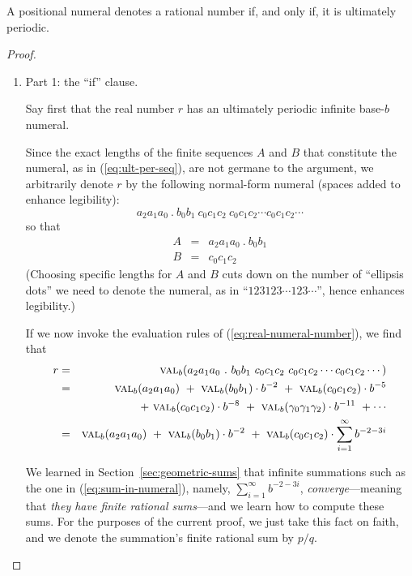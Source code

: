 \begin{prop}
\label{thm:rational-real}
A positional numeral denotes a rational number if, and only if, it is
ultimately periodic.
\end{prop}

\begin{proof}

\begin{enumerate}
\item 
{\small\sf Part 1: the ``if'' clause.}

Say first that the real number $r$ has an ultimately periodic infinite
base-$b$ numeral.

Since the exact lengths of the finite sequences $A$ and $B$ that
constitute the numeral, as in (\ref{eq:ult-per-seq}), are not germane
to the argument, we arbitrarily denote $r$ by the following
normal-form numeral (spaces added to enhance legibility):
\[  a_2 a_1 a_0 \ . \ b_0 b_1 \
c_0 c_1 c_2 \
c_0 c_1 c_2
\cdots
c_0 c_1 c_2
\cdots
\]
so that
\begin{eqnarray*}
A & = & a_2 a_1 a_0 \ . \ b_0 b_1 \\
B & = & c_0 c_1 c_2
\end{eqnarray*}
(Choosing specific lengths for $A$ and $B$ cuts down on the number of
``ellipsis dots'' we need to denote the numeral, as in ``$123 123
\cdots 123 \cdots$'', hence enhances legibility.)

If we now invoke the evaluation rules of (\ref{eq:real-numeral-number}),
we find that
\begin{eqnarray}
\nonumber
r & = &
\mbox{\sc val}_b(a_2 a_1 a_0 \ . \ b_0 b_1 \
c_0 c_1 c_2 \
c_0 c_1 c_2
\cdots
c_0 c_1 c_2
\cdots) \\
\nonumber
  & = &
\mbox{\sc val}_b(a_2 a_1 a_0)
 \ + \ \mbox{\sc val}_b(b_0 b_1) \cdot b^{-2}
 \ + \
\mbox{\sc val}_b(c_0 c_1 c_2) \cdot b^{-5} \\
\label{eq:sum-in-numeral}
  &  &
 \ + \
\mbox{\sc val}_b(c_0 c_1 c_2) \cdot b^{-8}
 \ + \
\mbox{\sc val}_b(\gamma_0 \gamma_1 \gamma_2) \cdot b^{-11}
\ + \cdots \\
\nonumber
  & = &
\mbox{\sc val}_b(a_2 a_1 a_0)
 \ + \ \mbox{\sc val}_b(b_0 b_1) \cdot b^{-2}
 \ + \
\mbox{\sc val}_b(c_0 c_1 c_2) \cdot \sum_{i=1}^\infty b^{-2-3i}
\end{eqnarray}

We learned in Section~\ref{sec:geometric-sums} that infinite
summations such as the one in (\ref{eq:sum-in-numeral}), namely,
$\sum_{i=1}^\infty b^{-2-3i}$, {\em converge}---meaning that {\em they
  have finite rational sums}---and we learn how to compute these sums.
For the purposes of the current proof, we just take this fact on
faith, and we denote the summation's finite rational sum by $p/q$.


\end{enumerate}
\end{proof}
